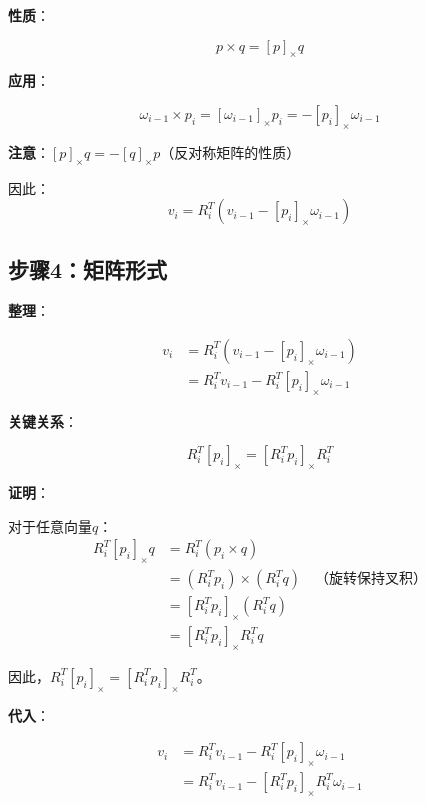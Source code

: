 \documentclass[12pt,a4paper]{article}
\begin{document}
\textbf{性质}：

\begin{equation}
p \times q = [p]_{\times} q
\end{equation}

\textbf{应用}：

\begin{equation}
\omega_{i-1} \times p_i = [\omega_{i-1}]_{\times} p_i = -[p_i]_{\times} \omega_{i-1}
\end{equation}

\textbf{注意}：$[p]_{\times} q = -[q]_{\times} p$（反对称矩阵的性质）

因此：
\begin{equation}
v_i = R_i^T (v_{i-1} - [p_i]_{\times} \omega_{i-1})
\end{equation}

\subsection{步骤4：矩阵形式}

\textbf{整理}：

\begin{align}
v_i &= R_i^T (v_{i-1} - [p_i]_{\times} \omega_{i-1}) \\
&= R_i^T v_{i-1} - R_i^T [p_i]_{\times} \omega_{i-1}
\end{align}

\textbf{关键关系}：

\begin{equation}
R_i^T [p_i]_{\times} = [R_i^T p_i]_{\times} R_i^T
\end{equation}

\textbf{证明}：

对于任意向量$q$：
\begin{align}
R_i^T [p_i]_{\times} q &= R_i^T (p_i \times q) \\
&= (R_i^T p_i) \times (R_i^T q) \quad \text{（旋转保持叉积）} \\
&= [R_i^T p_i]_{\times} (R_i^T q) \\
&= [R_i^T p_i]_{\times} R_i^T q
\end{align}

因此，$R_i^T [p_i]_{\times} = [R_i^T p_i]_{\times} R_i^T$。

\textbf{代入}：

\begin{align}
v_i &= R_i^T v_{i-1} - R_i^T [p_i]_{\times} \omega_{i-1} \\
&= R_i^T v_{i-1} - [R_i^T p_i]_{\times} R_i^T \omega_{i-1}
\end{align}
\end{document}
